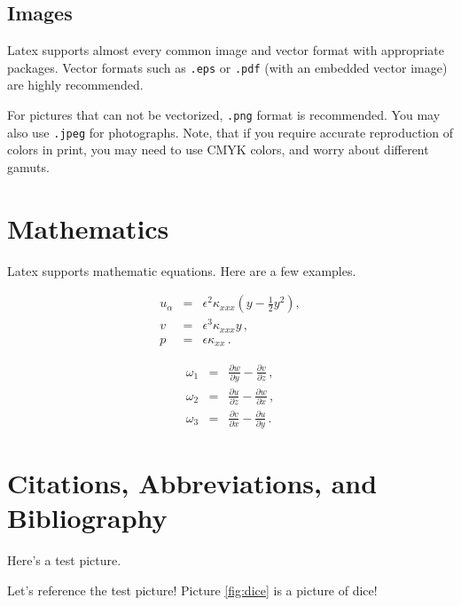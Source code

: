 \documentclass[english]{jamk-report}
\begin{document}
\subsection{Images}

Latex supports almost every common image and vector format with appropriate 
packages. Vector formats such as \texttt{.eps} or \texttt{.pdf} (with an embedded vector image)
are highly recommended.

For pictures that can not be vectorized, \texttt{.png} format is recommended. You
may also use \texttt{.jpeg} for photographs. Note, that if you require accurate
reproduction of colors in print, you may need to use CMYK colors, and worry about different gamuts.

\section{Mathematics}

Latex supports mathematic equations. Here are a few examples.

\begin{eqnarray}
    u_\alpha & = & \epsilon^2 \kappa_{xxx} 
    \left( y-\frac{1}{2}y^2 \right),
    \label{equ}  \\
    v & = & \epsilon^3 \kappa_{xxx} y\,,
    \label{eqv}  \\
    p & = & \epsilon \kappa_{xx}\,.
    \label{eqp}
\end{eqnarray}

\begin{eqnarray}
    \omega_1 & = &
    \frac{\partial w}{\partial y}-\frac{\partial v}{\partial z}\,,
    \nonumber  \\
    \omega_2 & = & 
    \frac{\partial u}{\partial z}-\frac{\partial w}{\partial x}\,,
    \label{eqcurl}  \\
    \omega_3 & = & 
    \frac{\partial v}{\partial x}-\frac{\partial u}{\partial y}\,.
    \nonumber
\end{eqnarray}

\section{Citations, Abbreviations, and Bibliography}

Here's a test picture.


Let's reference the test picture! Picture \ref{fig:dice} is a picture of
dice! 
\end{document}
